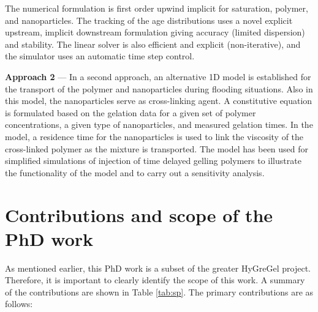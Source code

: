 The numerical formulation is first order upwind implicit for saturation, polymer, and nanoparticles. The tracking of the age distributions uses a novel explicit upstream, implicit downstream formulation giving accuracy (limited dispersion) and stability. The linear solver is also efficient and explicit (non-iterative), and the simulator uses an automatic time step control. 

\textbf{Approach 2} --- In a second approach, an alternative 1D model is established for the transport of the polymer and nanoparticles during flooding situations. Also in this model, the nanoparticles serve as cross-linking agent. A constitutive equation is formulated based on the gelation data for a given set of polymer concentrations, a given type of nanoparticles, and measured gelation times. In the model, a residence time for the nanoparticles is used to link the viscosity of the cross-linked polymer as the mixture is transported. The model has been used for simplified simulations of injection of time delayed gelling polymers to illustrate the functionality of the model and to carry out a sensitivity analysis.

\section{Contributions and scope of the PhD work}

As mentioned earlier, this PhD work is a subset of the greater HyGreGel project. Therefore, it is important to clearly identify the scope of this work. A summary of the contributions are shown in Table \ref{tab:sp}. The primary contributions are as follows:

